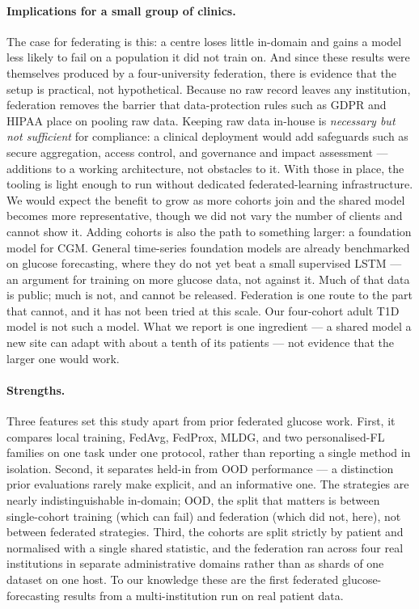 \documentclass[10pt,letterpaper]{article}
\begin{document}
\paragraph{Implications for a small group of clinics.} The case for
federating is this: a centre loses little in-domain and gains a model less
likely to fail on a population it did not train on. And since these results were themselves produced by a
four-university federation, there is evidence that the setup is practical,
not hypothetical. Because no raw record leaves any institution, federation
removes the barrier that data-protection rules such as GDPR and HIPAA place
on pooling raw data. Keeping raw data in-house is \emph{necessary but not
sufficient} for compliance: a clinical deployment would add safeguards such as
secure aggregation, access control, and governance and impact assessment ---
additions to a working architecture, not obstacles to it. With those in
place, the tooling is light enough to run without dedicated
federated-learning infrastructure. We
would expect the benefit to grow as more cohorts join and the shared model
becomes more representative, though we did not vary the number of clients and
cannot show it. Adding cohorts is also the path to something larger: a
foundation model for CGM. General time-series foundation models are already
benchmarked on glucose forecasting, where they do not yet beat a small
supervised LSTM \cite{lu2026glucofmbench} --- an argument for training on
more glucose data, not against it. Much of that data is public; much is not,
and cannot be released. Federation is one route to the part that cannot, and
it has not been tried at this scale. Our four-cohort adult T1D model is not
such a model. What we report is one ingredient --- a shared model a new site
can adapt with about a tenth of its patients --- not evidence that the larger
one would work.

\paragraph{Strengths.} Three features set this study apart from prior
federated glucose work. First, it compares local training, FedAvg, FedProx,
MLDG, and two personalised-FL families on one task under one protocol, rather
than reporting a single method in isolation. Second, it separates held-in
from OOD performance --- a distinction prior evaluations rarely make
explicit, and an informative one. The strategies are nearly indistinguishable
in-domain; OOD, the split that matters is between single-cohort training
(which can fail) and federation (which did not, here), not between federated
strategies. Third, the cohorts are split strictly by patient and normalised
with a single shared statistic, and the federation ran across four real
institutions in separate administrative domains rather than as shards of one
dataset on one host. To our knowledge these are the first federated
glucose-forecasting results from a multi-institution run on real patient data.
\end{document}
